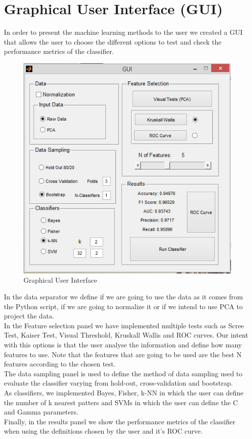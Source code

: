 \documentclass[english, a4paper, 12pt]{article}
\newcommand{\tab}{\hspace*{2em}}
\begin{document}
\section{Graphical User Interface (GUI)}
\tab In order to present the machine learning methods to the user we created a GUI that allows the user to choose the different options to test and check the performance metrics of the classifier.
\begin{figure}[H]
	\centering
	\includegraphics[scale= 0.8]{interface.png}
	\caption{Graphical User Interface}
\end{figure}
\tab In the data separator we define if we are going to use the data as it comes from the Python script, if we are going to normalize it or if we intend to use PCA to project the data.\\
\tab In the Feature selection panel we have implemented multiple tests such as Scree Test, Kaiser Test, Visual Threshold, Kruskall Wallis and ROC curves. Our intent with this options is that the user analyse the information and define how many features to use. Note that the features that are going to be used are the best N features according to the chosen test.\\
\tab The data sampling panel is used to define the method of data sampling used to evaluate the classifier varying from hold-out, cross-validation and bootstrap.\\
\tab As classifiers, we implemented Bayes, Fisher, k-NN in which the user can define the number of k nearest patters and SVMs in which the user can define the C and Gamma parameters.\\
\tab Finally, in the results panel we show the performance metrics of the classifier when using the definitions chosen by the user and it's ROC curve.
\pagebreak
\end{document}
